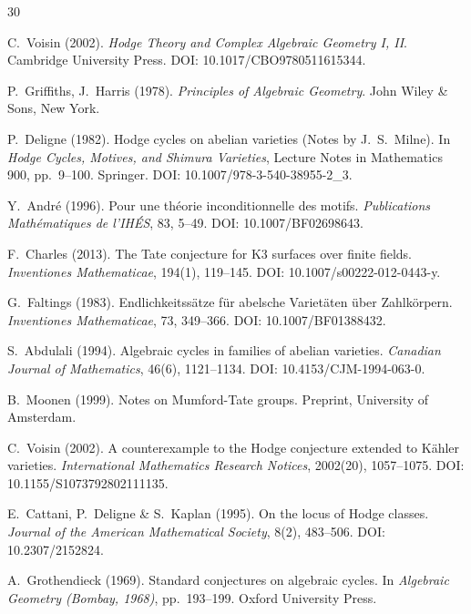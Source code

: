 \documentclass[aps,prd,twocolumn,superscriptaddress,nofootinbib]{revtex4-2}
\theoremstyle{definition}
\theoremstyle{remark}
\begin{document}
\begin{thebibliography}{30}

C.~Voisin (2002).
\textit{Hodge Theory and Complex Algebraic Geometry I, II}.
Cambridge University Press.
DOI: 10.1017/CBO9780511615344.

P.~Griffiths, J.~Harris (1978).
\textit{Principles of Algebraic Geometry}.
John Wiley \& Sons, New York.

P.~Deligne (1982).
Hodge cycles on abelian varieties (Notes by J.~S.~Milne).
In \textit{Hodge Cycles, Motives, and Shimura Varieties}, Lecture Notes in Mathematics 900, pp.\ 9--100. Springer.
DOI: 10.1007/978-3-540-38955-2\_3.

Y.~Andr\'e (1996).
Pour une th\'eorie inconditionnelle des motifs.
\textit{Publications Math\'ematiques de l'IH\'ES}, 83, 5--49.
DOI: 10.1007/BF02698643.

F.~Charles (2013).
The Tate conjecture for K3 surfaces over finite fields.
\textit{Inventiones Mathematicae}, 194(1), 119--145.
DOI: 10.1007/s00222-012-0443-y.

G.~Faltings (1983).
Endlichkeitss\"atze f\"ur abelsche Variet\"aten \"uber Zahlk\"orpern.
\textit{Inventiones Mathematicae}, 73, 349--366.
DOI: 10.1007/BF01388432.

S.~Abdulali (1994).
Algebraic cycles in families of abelian varieties.
\textit{Canadian Journal of Mathematics}, 46(6), 1121--1134.
DOI: 10.4153/CJM-1994-063-0.

B.~Moonen (1999).
Notes on Mumford-Tate groups.
Preprint, University of Amsterdam.

C.~Voisin (2002).
A counterexample to the Hodge conjecture extended to K\"ahler varieties.
\textit{International Mathematics Research Notices}, 2002(20), 1057--1075.
DOI: 10.1155/S1073792802111135.

E.~Cattani, P.~Deligne \& S.~Kaplan (1995).
On the locus of Hodge classes.
\textit{Journal of the American Mathematical Society}, 8(2), 483--506.
DOI: 10.2307/2152824.

A.~Grothendieck (1969).
Standard conjectures on algebraic cycles.
In \textit{Algebraic Geometry (Bombay, 1968)}, pp.\ 193--199. Oxford University Press.


\end{thebibliography}
\end{document}
